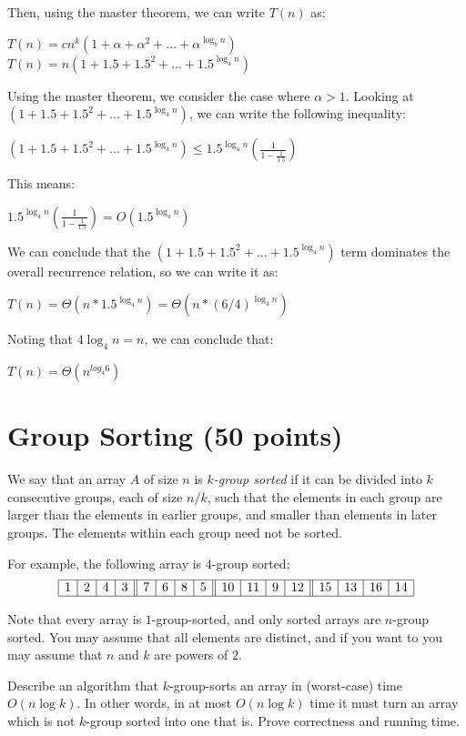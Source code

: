 \documentclass[11pt]{article}
\begin{document}
\begin{enumerate}
Then, using the master theorem, we can write $T(n)$ as:

$T(n) = cn^k (1 + \alpha + \alpha^2 + ... + \alpha^{\log_{b}{n}})$
$T(n) = n (1 + 1.5 + 1.5^2 + ... + 1.5^{\log_{4}{n}})$

Using the master theorem, we consider the case where $\alpha > 1$. 
Looking at $(1 + 1.5 + 1.5^2 + ... + 1.5^{\log_{4}{n}})$, we can write the following inequality: 

$(1 + 1.5 + 1.5^2 + ... + 1.5^{\log_{4}{n}}) \leq 1.5^{\log_{4}{n}} (\frac{1}{1-\frac{1}{1.5}})$

This means:

$1.5^{\log_{4}{n}} (\frac{1}{1-\frac{1}{1.5}}) = O(1.5^{\log_{4}{n}})$

We can conclude that the $(1 + 1.5 + 1.5^2 + ... + 1.5^{\log_{4}{n}})$ term dominates the overall recurrence relation, 
so we can write it as:

$T(n) = \Theta(n*1.5^{\log_{4}{n}}) = \Theta(n*(6/4)^{\log_{4}{n}})$

Noting that $4 \log_{4}{n} = n$, we can conclude that:

$T(n) = \Theta(n^{log_{4}{6}})$

\end{enumerate}

\section{Group Sorting (50 points)}
We say that an array $A$ of size $n$ is \emph{$k$-group sorted} if it can be divided into $k$ consecutive groups, each of size $n/k$, such that the elements in each group are larger than the elements in earlier groups, and smaller than elements in later groups. The elements within each group need not be sorted.   

For example, the following array is $4$-group sorted:
\[
\begin{array}{|c|c|c|c||c|c|c|c||c|c|c|c||c|c|c|c|}
\hline
1 &2 &4 &3 &7 &6 &8 &5 &10 &11 &9 &12 &15 &13 &16 &14\\
\hline
\end{array}
\]

Note that every array is $1$-group-sorted, and only sorted arrays are $n$-group sorted.  You may assume that all elements are distinct, and if you want to you may assume that $n$ and $k$ are powers of $2$. 

Describe an algorithm that $k$-group-sorts an array in (worst-case) time $O(n \log k)$.  In other words, in at most $O(n \log k)$ time it must turn an array which is not $k$-group sorted into one that is.  Prove correctness and running time.
\end{document}
